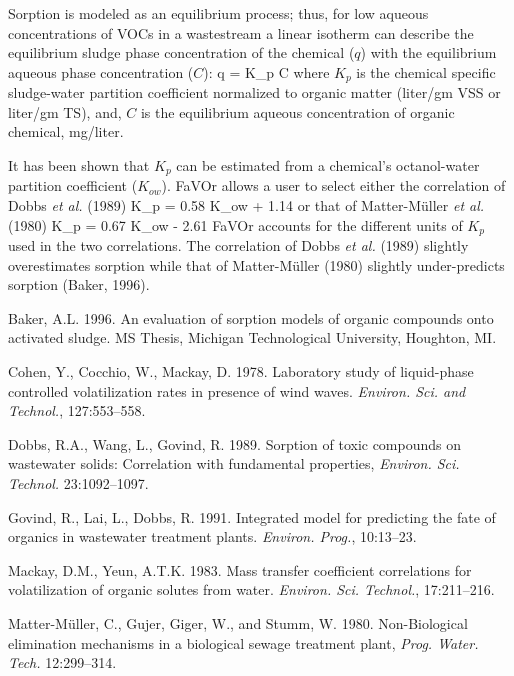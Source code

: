 Sorption is modeled as an equilibrium process; thus, for low aqueous
concentrations of VOCs in a wastestream a linear isotherm can describe
the equilibrium sludge phase concentration of the chemical ($q$) with
the equilibrium aqueous phase concentration ($C$):
\mb
q = K_p C
\mef
where $K_p$ is the chemical specific sludge-water partition
coefficient normalized to organic matter (liter/gm VSS or liter/gm
TS), and, $C$ is the equilibrium aqueous concentration of organic
chemical, mg/liter.

It has been shown that $K_p$ can be estimated from a chemical's
octanol-water partition coefficient ($K_{ow}$).  FaVOr allows a user
to select either the correlation of Dobbs {\it et al.} (1989)
\mb
\log K_p \;  = 0.58 \log K_{ow} + 1.14
\mef
or that of Matter-M\"uller {\it et al.} (1980)
\mb
\log K_p \;  = 0.67 \log K_{ow} - 2.61
\mef
FaVOr accounts for the different units of $K_p$ used in the two
correlations.  The correlation of Dobbs {\it et al.} (1989) slightly
overestimates sorption while that of Matter-M\"uller (1980) slightly
under-predicts sorption (Baker, 1996).


Baker, A.L. 1996. An evaluation of sorption models of organic compounds onto
activated sludge.  MS Thesis, Michigan Technological University, Houghton, MI.

Cohen, Y., Cocchio, W., Mackay, D. 1978. Laboratory study of
liquid-phase controlled volatilization rates in presence of wind
waves. {\it Environ. Sci. and Technol.}, 127:553--558.

Dobbs, R.A., Wang, L., Govind, R. 1989. Sorption of toxic compounds on
wastewater solids: Correlation with fundamental properties, {\it Environ. Sci.
Technol.} 23:1092--1097.

Govind, R., Lai, L., Dobbs, R. 1991. Integrated model for predicting
the fate of organics in wastewater treatment plants. {\it Environ.
Prog.}, 10:13--23.

Mackay, D.M., Yeun, A.T.K. 1983. Mass transfer coefficient correlations for
volatilization of organic solutes from water. {\it Environ. Sci. Technol.},
17:211--216. 

Matter-M\"uller, C., Gujer, Giger, W., and Stumm, W. 1980. Non-Biological
elimination mechanisms in a biological sewage treatment plant, {\it Prog.
Water. Tech.} 12:299--314.

  


\newpage

